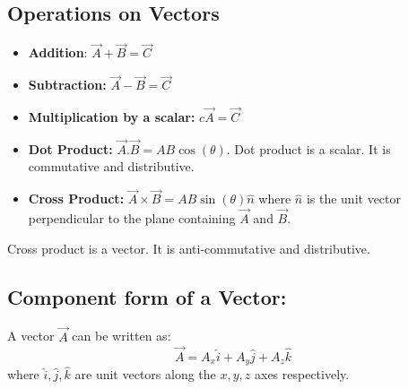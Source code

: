 \documentclass{article}
\begin{document}
\subsection{Operations on Vectors}
\begin{itemize}
    \item \textbf{Addition}: $\vec{A} + \vec{B} = \vec{C}$
    

    \item \textbf{Subtraction:} $\vec{A} - \vec{B} = \vec{C}$
    

    \item \textbf{Multiplication by a scalar: } $c\vec{A} = \vec{C}$
    \item \textbf{Dot Product: } $\vec{A}.\vec{B} = AB\cos(\theta)$.
        Dot product is a scalar. It is commutative and distributive.
    \item \textbf{Cross Product: } $\vec{A} \times \vec{B} = AB\sin(\theta) \hat{n}$
        where $\hat{n}$ is the unit vector perpendicular to the plane containing $\vec{A}$ and $\vec{B}$.
    \end{itemize}

        Cross product is a vector. It is anti-commutative and distributive.
    \subsection{Component form of a Vector: }
    A vector $\vec{A}$ can be written as:
    \[\vec{A} = A_x \hat{i} + A_y \hat{j} + A_z \hat{k}\]
    where $\hat{i}, \hat{j}, \hat{k}$ are unit vectors along the $x, y, z$ axes respectively.
\end{document}
